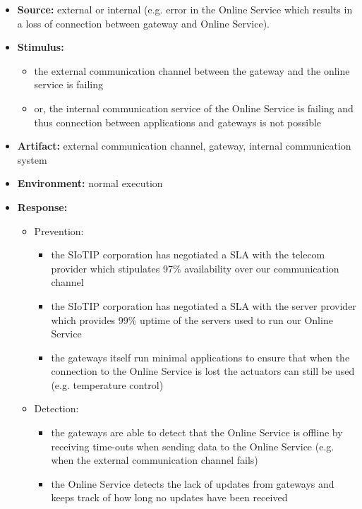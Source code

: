\begin{itemize}
    \item \textbf{Source:} external or internal (e.g. error in the Online Service which results in a loss of connection between gateway and Online Service).
    \item \textbf{Stimulus:}
        \begin{itemize}
            \item the external communication channel between the gateway and the online service is failing
            \item or, the internal communication service of the Online Service is failing and thus connection between applications and gateways is not possible
        \end{itemize}

    \item \textbf{Artifact:} external communication channel, gateway, internal communication system
    \item \textbf{Environment:} normal execution
    \item \textbf{Response:}
        \begin{itemize}
            \item Prevention:
            \begin{itemize}
            	\item the SIoTIP corporation has negotiated a SLA with the telecom provider which stipulates 97\% availability over our communication channel 
            	\item the SIoTIP corporation has negotiated a SLA with the server provider which provides 99\% uptime of the servers used to run our Online Service
            	\item the gateways itself run minimal applications to ensure that when the connection to the Online Service is lost the actuators can still be used (e.g. temperature control)
            \end{itemize}
            \item Detection:
            \begin{itemize}
            	\item the gateways are able to detect that the Online Service is offline by receiving time-outs when sending data to the Online Service (e.g. when the external communication channel fails)
            	\item the Online Service detects the lack of updates from gateways and keeps track of how long no updates have been received
            \end{itemize}

\end{itemize}
\end{itemize}
